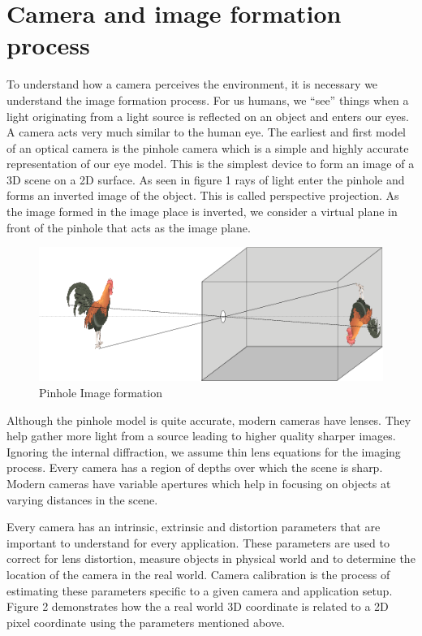 \section{Camera and image formation process}
\label{imageFormation}

To understand how a camera perceives the environment, it is necessary we understand the image formation process. For us humans, we “see” things when a light originating from a light source is reflected on an object and enters our eyes. A camera acts very much similar to the human eye. The earliest and first model of an optical camera is the pinhole camera which is a simple and highly accurate representation of our eye model. This is the simplest device to form an image of a 3D scene on a 2D surface. As seen in figure 1 rays of light enter the pinhole and forms an inverted image of the object. This is called perspective projection. As the image formed in the image place is inverted, we consider a virtual plane in front of the pinhole that acts as the image plane.  

\begin{figure}[H]
  \includegraphics[width=\textwidth]{./figures/imageFormation.png}
\caption{Pinhole Image formation}
\label{fig:1}       %
\end{figure}

Although the pinhole model is quite accurate, modern cameras have lenses. They help gather more light from a source leading to higher quality sharper images. Ignoring the internal diffraction, we assume thin lens equations for the imaging process. Every camera has a region of depths over which the scene is sharp. Modern cameras have variable apertures which help in focusing on objects at varying distances in the scene.  

Every camera has an intrinsic, extrinsic and distortion parameters that are important to understand for every application. These parameters are used to correct for lens distortion, measure objects in physical world and to determine the location of the camera in the real world. Camera calibration is the process of estimating these parameters specific to a given camera and application setup. Figure 2 demonstrates how the a real world 3D coordinate is related to a 2D pixel coordinate using the parameters mentioned above.

